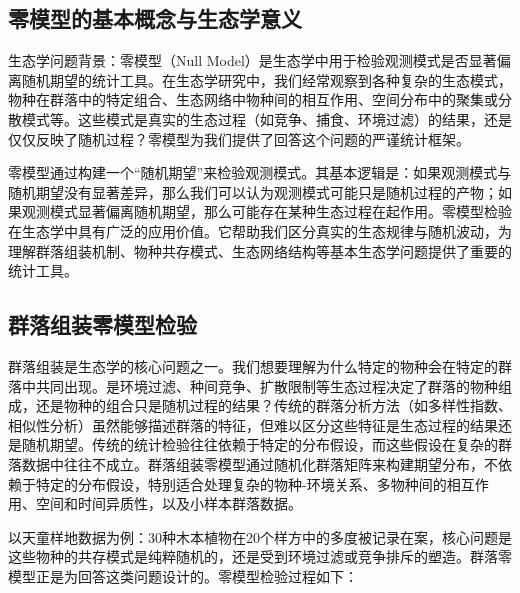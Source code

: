 \documentclass[
  twoside,12pt,fontset=none]{ctexbook}
\begin{document}
\hypertarget{ux96f6ux6a21ux578bux7684ux57faux672cux6982ux5ff5ux4e0eux751fux6001ux5b66ux610fux4e49}{%
\subsection{零模型的基本概念与生态学意义}\label{ux96f6ux6a21ux578bux7684ux57faux672cux6982ux5ff5ux4e0eux751fux6001ux5b66ux610fux4e49}}

生态学问题背景：零模型（Null Model）是生态学中用于检验观测模式是否显著偏离随机期望的统计工具。在生态学研究中，我们经常观察到各种复杂的生态模式，物种在群落中的特定组合、生态网络中物种间的相互作用、空间分布中的聚集或分散模式等。这些模式是真实的生态过程（如竞争、捕食、环境过滤）的结果，还是仅仅反映了随机过程？零模型为我们提供了回答这个问题的严谨统计框架。

零模型通过构建一个``随机期望''来检验观测模式。其基本逻辑是：如果观测模式与随机期望没有显著差异，那么我们可以认为观测模式可能只是随机过程的产物；如果观测模式显著偏离随机期望，那么可能存在某种生态过程在起作用。零模型检验在生态学中具有广泛的应用价值。它帮助我们区分真实的生态规律与随机波动，为理解群落组装机制、物种共存模式、生态网络结构等基本生态学问题提供了重要的统计工具。

\hypertarget{ux7fa4ux843dux7ec4ux88c5ux96f6ux6a21ux578bux68c0ux9a8c}{%
\subsection{群落组装零模型检验}\label{ux7fa4ux843dux7ec4ux88c5ux96f6ux6a21ux578bux68c0ux9a8c}}

群落组装是生态学的核心问题之一。我们想要理解为什么特定的物种会在特定的群落中共同出现。是环境过滤、种间竞争、扩散限制等生态过程决定了群落的物种组成，还是物种的组合只是随机过程的结果？传统的群落分析方法（如多样性指数、相似性分析）虽然能够描述群落的特征，但难以区分这些特征是生态过程的结果还是随机期望。传统的统计检验往往依赖于特定的分布假设，而这些假设在复杂的群落数据中往往不成立。群落组装零模型通过随机化群落矩阵来构建期望分布，不依赖于特定的分布假设，特别适合处理复杂的物种-环境关系、多物种间的相互作用、空间和时间异质性，以及小样本群落数据。

以天童样地数据为例：30种木本植物在20个样方中的多度被记录在案，核心问题是这些物种的共存模式是纯粹随机的，还是受到环境过滤或竞争排斥的塑造。群落零模型正是为回答这类问题设计的。零模型检验过程如下：
\end{document}

